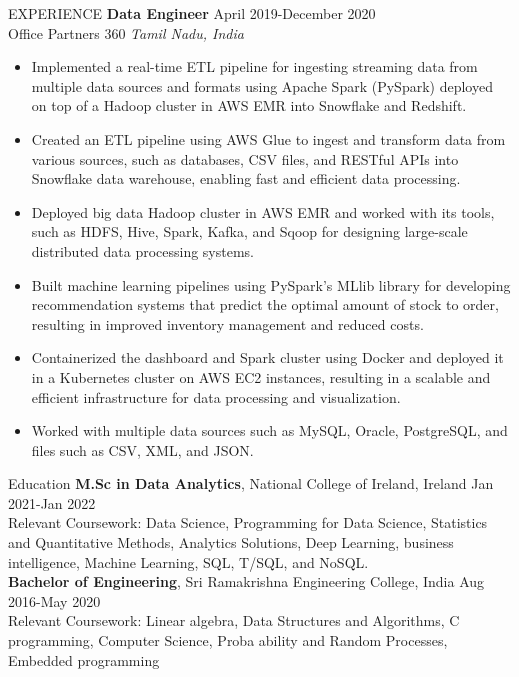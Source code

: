 \documentclass{resume} %
\begin{document}
\begin{rSection}{EXPERIENCE}
\textbf{Data Engineer} \hfill April 2019-December 2020\\
Office Partners 360 \hfill \textit{Tamil Nadu, India}
\begin{itemize}
    \itemsep -3pt {}
    \item Implemented a real-time ETL pipeline for ingesting streaming data from multiple data sources and formats using Apache Spark (PySpark) deployed on top of a Hadoop cluster in AWS EMR into Snowflake and Redshift.
    \item Created an ETL pipeline using AWS Glue to ingest and transform data from various sources, such as databases, CSV files, and RESTful APIs into Snowflake data warehouse, enabling fast and efficient data processing.
    \item Deployed big data Hadoop cluster in AWS EMR and worked with its tools, such as HDFS, Hive, Spark, Kafka, and Sqoop for designing large-scale distributed data processing systems.
    \item Built machine learning pipelines using PySpark’s MLlib library for developing recommendation systems that predict the optimal amount of stock to order, resulting in improved inventory management and reduced costs.
    \item Containerized the dashboard and Spark cluster using Docker and deployed it in a Kubernetes cluster on AWS EC2 instances, resulting in a scalable and efficient infrastructure for data processing and visualization.
    \item Worked with multiple data sources such as MySQL, Oracle, PostgreSQL, and files such as CSV, XML, and JSON.
\end{itemize}
\end{rSection} 



\begin{rSection}{Education}
{\bf M.Sc in Data Analytics}, National College of Ireland, Ireland \hfill {Jan 2021-Jan 2022}\\
Relevant Coursework: Data Science, Programming for Data Science, Statistics and Quantitative Methods, Analytics
 Solutions, Deep Learning, business intelligence, Machine Learning, SQL, T/SQL, and NoSQL.\\
{\bf Bachelor of Engineering}, Sri Ramakrishna Engineering College, India \hfill {Aug 2016-May 2020}\\
 Relevant Coursework: Linear algebra, Data Structures and Algorithms, C programming, Computer Science, Proba
ability and Random Processes, Embedded programming
\end{rSection}
\end{document}
